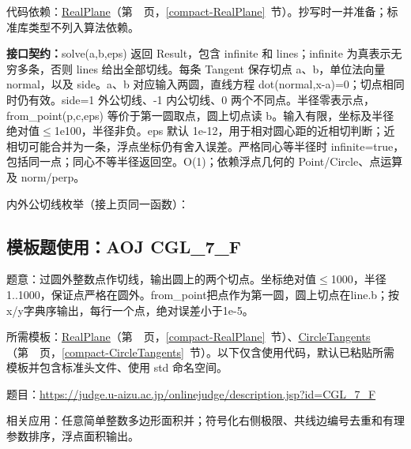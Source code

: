 代码依赖：\hyperref[compact-RealPlane]{RealPlane}（第~\pageref{compact-RealPlane}~页，\ref{compact-RealPlane}~节）。抄写时一并准备；标准库类型不列入算法依赖。

{\sloppy{}\noindent\textbf{接口契约：}solve(a,b,eps) 返回 Result，包含 infinite 和 lines；infinite 为真表示无穷多条，否则 lines 给出全部切线。每条 Tangent 保存切点 a、b，单位法向量 normal，以及 side。a、b 对应输入两圆，直线方程 dot(normal,x-a)=0；切点相同时仍有效。side=1 外公切线、-1 内公切线、0 两个不同点。半径零表示点，from\_point(p,c,eps) 等价于第一圆取点，圆上切点读 b。输入有限，坐标及半径绝对值$\le$1e100，半径非负。eps 默认 1e-12，用于相对圆心距的近相切判断；近相切可能合并为一条，浮点坐标仍有舍入误差。严格同心等半径时 infinite=true，包括同一点；同心不等半径返回空。O(1)；依赖浮点几何的 Point/Circle、点运算及 norm/perp。\par}

\Needspace{400pt}



\newpage

\noindent 内外公切线枚举（接上页同一函数）：



\Needspace{352pt}

\subsection*{模板题使用：AOJ CGL\_7\_F}

\label{usage-example-155}

题意：过圆外整数点作切线，输出圆上的两个切点。坐标绝对值$\le$1000，半径1..1000，保证点严格在圆外。from\_point把点作为第一圆，圆上切点在line.b；按x/y字典序输出，每行一个点，绝对误差小于1e-5。

所需模板：\hyperref[compact-RealPlane]{RealPlane}（第~\pageref{compact-RealPlane}~页，\ref{compact-RealPlane}~节）、\hyperref[compact-CircleTangents]{CircleTangents}（第~\pageref{compact-CircleTangents}~页，\ref{compact-CircleTangents}~节）。以下仅含使用代码，默认已粘贴所需模板并包含标准头文件、使用 std 命名空间。

题目：\url{https://judge.u-aizu.ac.jp/onlinejudge/description.jsp?id=CGL_7_F}



\newpage

\noindent 相关应用：任意简单整数多边形面积并；符号化右侧极限、共线边编号去重和有理参数排序，浮点面积输出。

